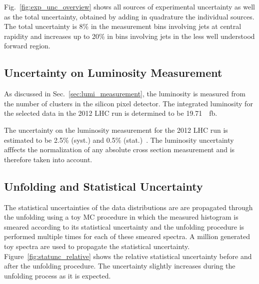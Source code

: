 Fig.~\ref{fig:exp_unc_overview} shows all sources of experimental uncertainty as
well as the total uncertainty, obtained by adding in quadrature the individual
sources. The total uncertainty is 8\% in the measurement bins involving jets at
central rapidity and increases up to 20\% in bins involving jets in the less
well understood forward region.


\subsection {Uncertainty on Luminosity Measurement}
\label{sec:luminosity_uncertainty}

As discussed in Sec.~\ref{sec:lumi_measurement}, the luminosity is measured from
the number of clusters in the silicon pixel detector. The integrated luminosity
for the selected data in the 2012 LHC run is determined to be \SI{19.71}{\per
\femto \barn}. 

The uncertainty on the luminosity measurement for the 2012 LHC run is estimated
to be 2.5\% (syst.) and 0.5\% (stat.)~\cite{CMS-PAS-LUM-13-001}. The luminosity
uncertainty afffects the normalization of any absolute cross section measurement
and is therefore taken into account.

\subsection{Unfolding and Statistical Uncertainty}
\label{sec:stat_unf_uncert}

The statistical uncertainties of the data distributions are are propagated
through the unfolding using a toy MC procedure in which the measured histogram
is smeared according to its statistical uncertainty and the unfolding procedure
is performed multiple times for each of these smeared spectra. A million
generated toy spectra are used to propagate the statistical uncertainty.
Figure~\ref{fig:statunc_relative} shows the relative statistical uncertainty before and
after the unfolding procedure. The uncertainty slightly increases during the unfolding
process as it is expected.

